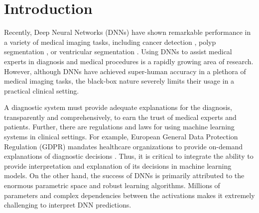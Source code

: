 \documentclass[twocolumn,final]{elsarticle}
\begin{document}
\section{Introduction}
%
Recently, Deep Neural Networks (DNNs) have shown remarkable performance in a variety of medical imaging tasks, including cancer detection \citep{kooi2017large, codella2017deep, langlotz2019roadmap, chu2019application, pirovano2021computer}, polyp segmentation \citep{wu2021collaborative, wu2021precise, wu2022polypseg}, or ventricular segmentation \citep{wu2021automated, wu2022semi}. Using DNNs to assist medical experts in diagnosis and medical procedures is a rapidly growing area of research. However, although DNNs have achieved super-human accuracy in a plethora of medical imaging tasks, the black-box nature severely limits their usage in a practical clinical setting. 

\par A diagnostic system must provide adequate explanations for the diagnosis, transparently and comprehensively, to earn the trust of medical experts and patients. Further, there are regulations and laws for using machine learning systems in clinical settings. For example, European General Data Protection Regulation (GDPR) mandates healthcare organizations to provide on-demand explanations of diagnostic decisions \citep{hoofnagle2019european}. Thus, it is critical to integrate the ability to provide interpretation and explanation of its decisions in machine learning models. On the other hand, the success of DNNs is primarily attributed to the enormous parametric space and robust learning algorithms. Millions of parameters and complex dependencies between the activations makes it extremely challenging to interpret DNN predictions.  
\end{document}
